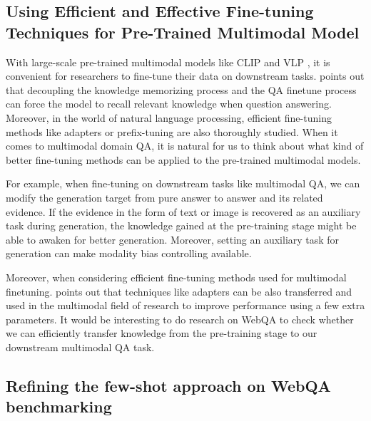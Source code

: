 \documentclass[nohyperref]{article}
\theoremstyle{plain}
\theoremstyle{definition}
\theoremstyle{remark}
\begin{document}
    \subsection{Using Efficient and Effective Fine-tuning Techniques for Pre-Trained Multimodal Model}
    With large-scale pre-trained multimodal models like CLIP \citep{clip} and VLP \citep{vlp}, it is convenient for researchers to fine-tune their data on downstream tasks. \citet{DBLP:journals/corr/abs-2106-01561} points out that decoupling the knowledge memorizing process and the QA finetune process can force the model to recall relevant knowledge
    when question answering. Moreover, in the world of natural language processing, efficient fine-tuning methods like adapters or prefix-tuning are also thoroughly studied. When it comes to multimodal domain QA, it is natural for us to think about what kind of better fine-tuning methods can be applied to the pre-trained multimodal models.\par

    For example, when fine-tuning on downstream tasks like multimodal QA, we can modify the generation target from pure answer to answer and its related evidence. If the evidence in the form of text or image is recovered as an auxiliary task during generation, the knowledge gained at the pre-training stage might be able to awaken for better generation. Moreover, setting an auxiliary task for generation can make modality bias controlling available.\par

    Moreover, when considering efficient fine-tuning methods used for multimodal finetuning. \citet{https://doi.org/10.48550/arxiv.2208.02532} points out that techniques like adapters can be also transferred and used in the multimodal field of research to improve performance using a few extra parameters. It would be interesting to do research on WebQA to check whether we can efficiently transfer knowledge from the pre-training stage to our downstream multimodal QA task.

    \subsection{Refining the few-shot approach on WebQA benchmarking}
\end{document}
